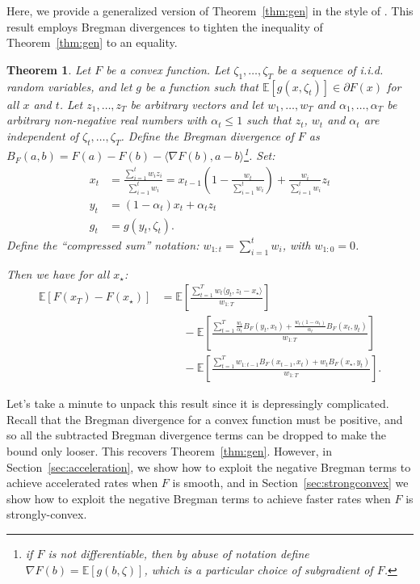 \documentclass{article}
\newtheorem{theorem}{Theorem}
\newcommand{\E}{\mathbb{E}}
\begin{document}
Here, we provide a generalized version of Theorem~\ref{thm:gen} in the style of \cite{joulani2020simpler}. This result employs Bregman divergences to tighten the inequality of Theorem~\ref{thm:gen} to an equality.
\begin{theorem}\label{thm:genbregman}
Let $F$ be a convex function.
Let $\zeta_1,\dots,\zeta_T$ be a sequence of i.i.d. random variables, and let $g$ be a function such that $\E[g(x,\zeta_t)] \in \partial F(x)$ for all $x$ and $t$. Let $z_1,\dots,z_T$ be arbitrary vectors and let $w_1,\dots,w_T$ and $\alpha_1,\dots,\alpha_T$ be arbitrary non-negative  real numbers with $\alpha_t \le 1$ such that $z_t$, $w_t$ and $\alpha_t$ are independent of $\zeta_t,\dots,\zeta_{T}$. Define the Bregman divergence of $F$ as $B_F(a,b)=F(a)-F(b) - \langle \nabla F(b), a-b\rangle$\footnote{if $F$ is not differentiable, then by abuse of notation define $\nabla F(b)=\mathbb{E}[g(b,\zeta)]$, which is a particular choice of subgradient of $F$.}. Set:
\begin{align*}
x_t &= \frac{\sum_{i=1}^t w_i z_i}{\sum_{i=1}^t w_i} =x_{t-1}\left(1-\frac{w_t}{\sum_{i=1}^t w_i}\right) + \frac{w_i}{\sum_{i=1}^t w_i} z_t\\
y_t &= (1-\alpha_t)x_t + \alpha_tz_t\\
g_t&= g(y_t,\zeta_t).
\end{align*}
Define the ``compressed sum'' notation: $w_{1:t} = \sum_{i=1}^t w_i$, with $w_{1:0}=0$.

Then we have for all $x_\star$:
\begin{align*}
    \mathbb{E}[F(x_T) - F(x_\star)]&= \mathbb{E}\left[\frac{\sum_{t=1}^T w_t\langle g_t, z_t -x_\star\rangle}{w_{1:T}}\right]\\
     &\qquad-\mathbb{E}\left[\frac{\sum_{t=1}^T \frac{w_t}{\alpha_t}B_F(y_t,x_t) + \frac{w_t(1-\alpha_t)}{\alpha_t}B_F(x_t, y_t)}{w_{1:T}}\right] \\
    &\qquad- \mathbb{E}\left[\frac{\sum_{t=1}^T w_{1:t-1} B_F(x_{t-1},x_t) + w_t B_F(x_\star, y_t)}{w_{1:T}}\right].
\end{align*}
\end{theorem}
Let's take a minute to unpack this result since it is depressingly complicated. Recall that the Bregman divergence for a convex function must be positive, and so all the subtracted Bregman divergence terms can be dropped to make the bound only looser. This recovers Theorem~\ref{thm:gen}. However, in Section~\ref{sec:acceleration}, we show how  to exploit the negative Bregman terms to achieve accelerated rates when $F$ is smooth, and in Section~\ref{sec:strongconvex} we show how to exploit the negative Bregman terms to achieve faster rates when  $F$ is strongly-convex.
\end{document}
